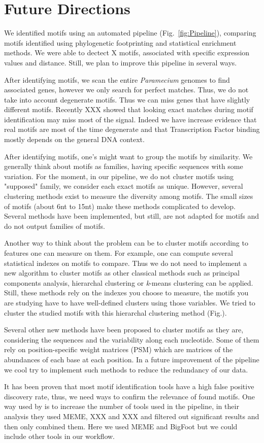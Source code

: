 \section*{Future Directions}

We identified motifs using an automated pipeline (Fig.~\ref{fig:Pipeline}), comparing motifs identified using phylogenetic footprinting and statistical enrichment methods. We were able to dectect X motifs, associated with specific expression values and distance. Still, we plan to improve this pipeline in several ways.

After identifying motifs, we scan the entire \textit{Paramecium} genomes to find associated genes, however we only search for perfect matches. Thus, we do not take into account degenerate motifs. Thus we can miss genes that have slightly different motifs. Recently XXX showed that looking exact matches during motif identification may miss most of the signal. Indeed we have increase evidence that real motifs are most of the time degenerate and that Transcription Factor binding mostly depends on the general DNA context.

After identifying motifs, one's might want to group the motifs by similarity. We generally think about motifs as families, having specific sequences with some variation. For the moment, in our pipeline, we do not cluster motifs using "supposed" family, we consider each exact motifs as unique. However, several clustering methods exist to measure the diversity among motifs. The small sizes of motifs (about 6nt to 15nt) make these methods complicated to develop. Several methods have been implemented, but still, are not adapted for motifs and do not output families of motifs. 

Another way to think about the problem can be to cluster motifs according to features one can measure on them. For example, one can compute several statistical indexes on motifs to compare. Thus we do not need to implement a new algorithm to cluster motifs as other classical methods such as principal components analysis, hierarchal clustering or \textit{k}-means clustering can be applied. Still, these methods rely on the indexes you choose to measure, the motifs you are studying have to have well-defined clusters using those variables. We tried to cluster the studied motifs with this hierarchal clustering method (Fig.).

Several other new methods have been proposed to cluster motifs as they are, considering the sequences and the variability along each nucleotide. Some of them rely on position-specific weight matrices (PSM) which are matrices of the abundances of each base at each position. In a future improvement of the pipeline we cool try to implement such methods to reduce the redundancy of our data.

It has been proven that most motif identification tools have a high false positive discovery rate, thus, we need ways to confirm the relevance of found motifs. One way used by \citealt{liseron-monfils_promzea:_2013} is to increase the number of tools used in the pipeline, in their analysis they used MEME, XXX and XXX and filtered out significant results and then only combined them. Here we used MEME and BigFoot but we could include other tools in our workflow.